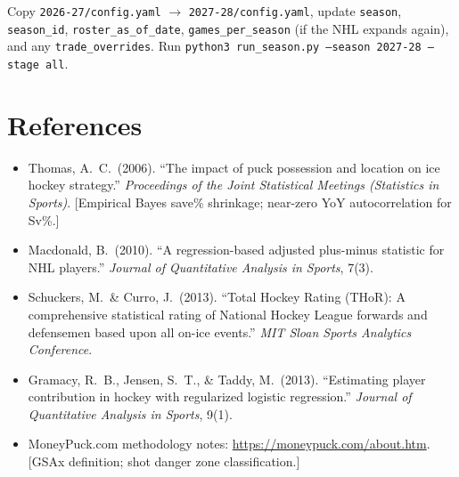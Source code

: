 \documentclass[11pt, a4paper]{article}
\begin{document}
\begin{description}[leftmargin=3cm, style=nextline]
  \item[2027-28 season]
        Copy \texttt{2026-27/config.yaml} $\to$ \texttt{2027-28/config.yaml}, update
        \texttt{season}, \texttt{season\_id}, \texttt{roster\_as\_of\_date},
        \texttt{games\_per\_season} (if the NHL expands again), and any
        \texttt{trade\_overrides}. Run \texttt{python3 run\_season.py --season 2027-28 --stage all}.

\end{description}


\section*{References}

\begin{itemize}[leftmargin=*]
  \item Thomas, A.\ C.\ (2006). ``The impact of puck possession and location on ice hockey
        strategy.'' \emph{Proceedings of the Joint Statistical Meetings (Statistics in Sports)}.
        [Empirical Bayes save\% shrinkage; near-zero YoY autocorrelation for Sv\%.]
  \item Macdonald, B.\ (2010). ``A regression-based adjusted plus-minus statistic for NHL
        players.'' \emph{Journal of Quantitative Analysis in Sports}, 7(3).
  \item Schuckers, M.\ \& Curro, J.\ (2013). ``Total Hockey Rating (THoR): A comprehensive
        statistical rating of National Hockey League forwards and defensemen based upon all
        on-ice events.'' \emph{MIT Sloan Sports Analytics Conference}.
  \item Gramacy, R.\ B., Jensen, S.\ T., \& Taddy, M.\ (2013). ``Estimating player contribution
        in hockey with regularized logistic regression.'' \emph{Journal of Quantitative Analysis
        in Sports}, 9(1).
  \item MoneyPuck.com methodology notes: \url{https://moneypuck.com/about.htm}.
        [GSAx definition; shot danger zone classification.]
\end{itemize}
\end{document}
